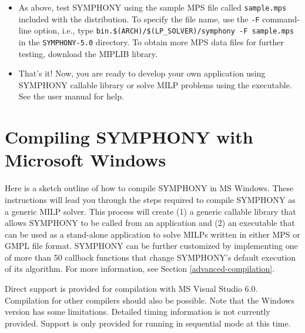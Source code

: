 \begin{itemize}
        \item As above, test SYMPHONY using the sample MPS file called
        \texttt{sample.mps} included with the distribution. To specify the
        file name, use the \texttt{-F} command-line option, i.e., type
        \texttt{bin.\$(ARCH)/\$(LP\_SOLVER)/symphony -F sample.mps} in the
        \texttt{SYMPHONY-5.0} directory. To obtain more MPS data files
        for further testing, download the MIPLIB library.

        \item That's it! Now, you are ready to develop your own application 
	using  SYMPHONY callable library or solve MILP problems using the 
	executable. See the user manual for help. 

\end{itemize}


\section{Compiling SYMPHONY with Microsoft Windows}
\label{getting_started_windows}

Here is a sketch outline of how to compile SYMPHONY in MS Windows. These
instructions will lead you through the steps required to compile SYMPHONY as a
generic MILP solver. This process will create (1) a generic callable library
that allows SYMPHONY to be called from an application and (2) an executable
that can be used as a stand-alone application to solve MILPs written in either
MPS or GMPL file format. SYMPHONY can be further customized by implementing
one of more than 50 callback functions that change SYMPHONY's default
execution of its algorithm. For more information, see Section
\ref{advanced-compilation}.

Direct support is provided for compilation with MS Visual Studio 6.0.
Compilation for other compilers should also be possible. Note that the Windows
version has some limitations. Detailed timing information is not currently
provided. Support is only provided for running in sequential mode at this
time.

